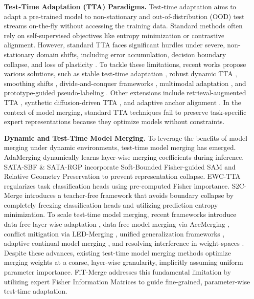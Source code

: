 \documentclass{article}
\theoremstyle{plain}
\theoremstyle{definition}
\theoremstyle{remark}
\begin{document}
\textbf{Test-Time Adaptation (TTA) Paradigms.} Test-time adaptation aims to adapt a pre-trained model to non-stationary and out-of-distribution (OOD) test streams on-the-fly without accessing the training data. Standard methods often rely on self-supervised objectives like entropy minimization \cite{entropyisnotenough2024} or contrastive alignment. However, standard TTA faces significant hurdles under severe, non-stationary domain shifts, including error accumulation, decision boundary collapse, and loss of plasticity \cite{addressinglossplasticitycatastrophic2024}. To tackle these limitations, recent works propose various solutions, such as stable test-time adaptation \cite{towardsstabletesttimeadaptation2023}, robust dynamic TTA \cite{robusttesttimeadaptationdynamic2023}, smoothing shifts \cite{smoothingshifttowardsstable2025}, divide-and-conquer frameworks \cite{dcttadivideandconquerframeworktesttime2025}, multimodal adaptation \cite{mmttamultimodaltesttimeadaptation2022, searchttamultimodaltesttimeadaptation2025}, and prototype-guided pseudo-labeling \cite{platottaprototypeguidedpseudolabelingadaptive2025}. Other extensions include retrieval-augmented TTA \cite{rattaretrievalaugmentedtesttimeadaptation2025}, synthetic diffusion-driven TTA \cite{everythingsyntheticdiffusiondriventesttime2025}, and adaptive anchor alignment \cite{a3ttaadaptiveanchoralignment2025}. In the context of model merging, standard TTA techniques fail to preserve task-specific expert representations because they optimize models without constraints.

\textbf{Dynamic and Test-Time Model Merging.} To leverage the benefits of model merging under dynamic environments, test-time model merging has emerged. AdaMerging \cite{adamerging} dynamically learns layer-wise merging coefficients during inference. SATA-SBF \& SATA-RGP \cite{satasbf} incorporate Soft-Bounded Fisher-guided SAM and Relative Geometry Preservation to prevent representation collapse. EWC-TTA \cite{ewctta} regularizes task classification heads using pre-computed Fisher importance. S2C-Merge \cite{s2cmerge} introduces a teacher-free framework that avoids boundary collapse by completely freezing classification heads and utilizing prediction entropy minimization. To scale test-time model merging, recent frameworks introduce data-free layer-wise adaptation \cite{larvdatafreelayerwiseadaptive2026}, data-free model merging via AceMerging \cite{acemergingdatafreemodelmerging2026}, conflict mitigation via LED-Merging \cite{ledmergingmitigatingsafetyutilityconflicts2025}, unified generalization frameworks \cite{unifiedgeneralizationframeworkmodel2026}, adaptive continual model merging \cite{towardsadaptivecontinualmodel2026}, and resolving interference in weight-spaces \cite{resolvinginterferenceridisentangling2026, whoeverstartedinterferenceshould2025, dellamergingreducinginterferencemodel2024}. Despite these advances, existing test-time model merging methods optimize merging weights at a coarse, layer-wise granularity, implicitly assuming uniform parameter importance. FiT-Merge addresses this fundamental limitation by utilizing expert Fisher Information Matrices to guide fine-grained, parameter-wise test-time adaptation.
\end{document}
